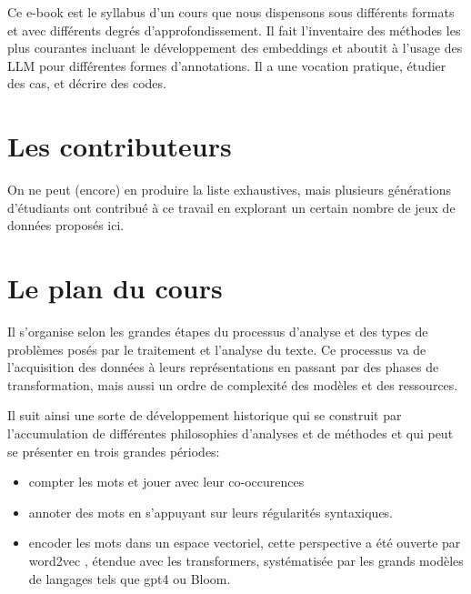 \documentclass[
  letterpaper,
  DIV=11,
  numbers=noendperiod]{scrreprt}
\begin{document}

Ce e-book est le syllabus d'un cours que nous dispensons sous différents
formats et avec différents degrés d'approfondissement. Il fait
l'inventaire des méthodes les plus courantes incluant le développement
des embeddings et aboutit à l'usage des LLM pour différentes formes
d'annotations. Il a une vocation pratique, étudier des cas, et décrire
des codes.

\section*{Les contributeurs}\label{les-contributeurs}


On ne peut (encore) en produire la liste exhaustives, mais plusieurs
générations d'étudiants ont contribué à ce travail en explorant un
certain nombre de jeux de données proposés ici.

\section*{Le plan du cours}\label{le-plan-du-cours}


Il s'organise selon les grandes étapes du processus d'analyse et des
types de problèmes posés par le traitement et l'analyse du texte. Ce
processus va de l'acquisition des données à leurs représentations en
passant par des phases de transformation, mais aussi un ordre de
complexité des modèles et des ressources.

Il suit ainsi une sorte de développement historique qui se construit par
l'accumulation de différentes philosophies d'analyses et de méthodes et
qui peut se présenter en trois grandes périodes:

\begin{itemize}
\item
  compter les mots et jouer avec leur co-occurences
\item
  annoter des mots en s'appuyant sur leurs régularités syntaxiques.
\item
  encoder les mots dans un espace vectoriel, cette perspective a été
  ouverte par word2vec , étendue avec les transformers, systématisée par
  les grands modèles de langages tels que gpt4 ou Bloom.
\end{itemize}
\end{document}
